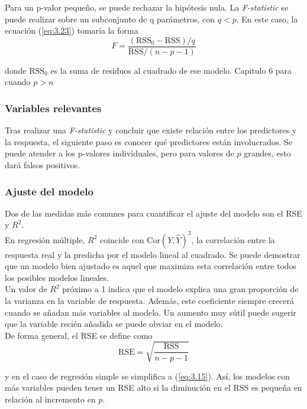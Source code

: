 Para un p-valor pequeño, se puede rechazar la hipótesis nula. La \textit{F-statistic} se puede realizar sobre un subconjunto de q parámetros, con $q < p$. En este caso, la ecuación (\ref{eq:3.23}) tomaría la forma 
\begin{equation}
F = \frac{(\text{RSS}_0 - \text{RSS})/q}{\text{RSS}/(n - p - 1)}
\end{equation}

\noindent donde $\text{RSS}_0$ es la suma de residuos al cuadrado de ese modelo. Capitulo 6 para cuando $p > n$

\subsubsection{Variables relevantes}

Tras realizar una \textit{F-statistic} y concluir que existe relación entre los predictores y la respuesta, el siguiente paso es conocer qué predictores están involucrados. Se puede atender a los p-valores individuales, pero para valores de $p$ grandes, esto dará falsos positivos. 

\subsubsection{Ajuste del modelo}

Dos de las medidas más comunes para cuantificar el ajuste del modelo son el RSE y $R^2$. \\

En regresión múltiple, $R^2$ coincide con $\text{Cor}(Y, \hat{Y})^2$, la correlación entre la respuesta real y la predicha por el modelo lineal al cuadrado. Se puede demostrar que un modelo bien ajustado es aquel que maximiza esta correlación entre todos los posibles modelos lineales. \\

Un valor de $R^2$ próximo a 1 indica que el modelo explica una gran proporción de la varianza en la variable de respuesta. Además, este coeficiente siempre crecerá cuando se añadan más variables al modelo. Un aumento muy sútil puede sugerir que la variable recién añadida se puede obviar en el modelo. \\

\noindent De forma general, el RSE se define como 
\begin{equation}
\text{RSE} = \sqrt{\frac{\text{RSS}}{n - p - 1}}
\end{equation}

y en el caso de regresión simple se simplifica a (\ref{eq:3.15}). Así, los modelos con más variables pueden tener un RSE alto si la diminución en el RSS es pequeña en relación al incremento en $p$.

